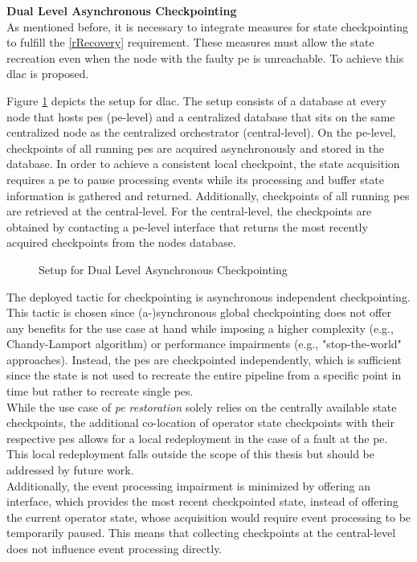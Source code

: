 \textbf{Dual Level Asynchronous Checkpointing}\\
As mentioned before, it is necessary to integrate measures for state checkpointing to fulfill the \ref{rRecovery} requirement. These measures must allow the state recreation even when the node with the faulty \gls{pe} is unreachable. To achieve this \gls{dlac} is proposed.\par
Figure \ref{fDLAC} depicts the setup for \gls{dlac}. The setup consists of a database at every node that hosts \gls{pe}s (\gls{pe}-level) and a centralized database that sits on the same centralized node as the centralized orchestrator (central-level). On the \gls{pe}-level, checkpoints of all running \gls{pe}s are acquired asynchronously and stored in the database. In order to achieve a consistent local checkpoint, the state acquisition requires a \gls{pe} to pause processing events while its processing and buffer state information is gathered and returned. Additionally, checkpoints of all running \gls{pe}s are retrieved at the central-level. For the central-level, the checkpoints are obtained by contacting a \gls{pe}-level interface that returns the most recently acquired checkpoints from the nodes database.\par
\begin{figure}[H]
\graphicspath{{./figures/code/}}

\caption{Setup for Dual Level Asynchronous Checkpointing}
\label{fDLAC}
\end{figure}
The deployed tactic for checkpointing is asynchronous independent checkpointing. This tactic is chosen since (a-)synchronous global checkpointing does not offer any benefits for the use case at hand while imposing a higher complexity (e.g., Chandy-Lamport algorithm) or performance impairments (e.g., "stop-the-world" approaches). Instead, the \gls{pe}s are checkpointed independently, which is sufficient since the state is not used to recreate the entire pipeline from a specific point in time but rather to recreate single \gls{pe}s.\\
While the use case of \textit{\acrshort{pe} restoration} solely relies on the centrally available state checkpoints, the additional co-location of operator state checkpoints with their respective \gls{pe}s allows for a local redeployment in the case of a fault at the \gls{pe}. This local redeployment falls outside the scope of this thesis but should be addressed by future work.\\
Additionally, the event processing impairment is minimized by offering an interface, which provides the most recent checkpointed state, instead of offering the current operator state, whose acquisition would require event processing to be temporarily paused. This means that collecting checkpoints at the central-level does not influence event processing directly.\par



